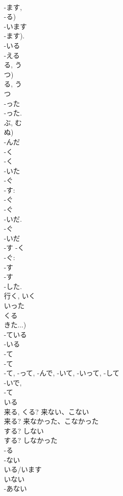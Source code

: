 \documentclass[8pt]{extreport}
\begin{document}
\begin{CJK}{UTF8}{min}
\\	-ます, 
\\	-る) 
\\	-います 
\\	-ます).
\\	-いる 
\\	-える 
\\	る, う 
\\	つ) 
\\	る, う 
\\	つ
\\	-った		
\\	-った.
\\	ぶ, む 
\\	ぬ) 
\\	-んだ		
\\	-く 
\\	-く 
\\	-いた
\\	-ぐ 
\\	-す: 
\\	-ぐ 
\\	-ぐ 
\\	-いだ.
\\	-ぐ 
\\	-いだ 
\\	-す -く 
\\	-ぐ: 
\\	-す 
\\	-す
\\	-した.
\\	行く, いく 
\\	いった	
\\	くる 
\\	きた...)
\\	-ている 
\\	-いる 
\\	-て 
\\	-て 
\\	-て, -って, -んで, -いて, -いって, -して 
\\	-いで, 
\\	-て 
\\	いる 
\\	来る, くる?	来ない、こない	
\\	来る?	来なかった、こなかった	
\\	する?	しない	
\\	する?	しなかった	
\\	-る 
\\	-ない	
\\	いる/います 
\\	いない	
\\	-あない 

\end{CJK}
\end{document}
